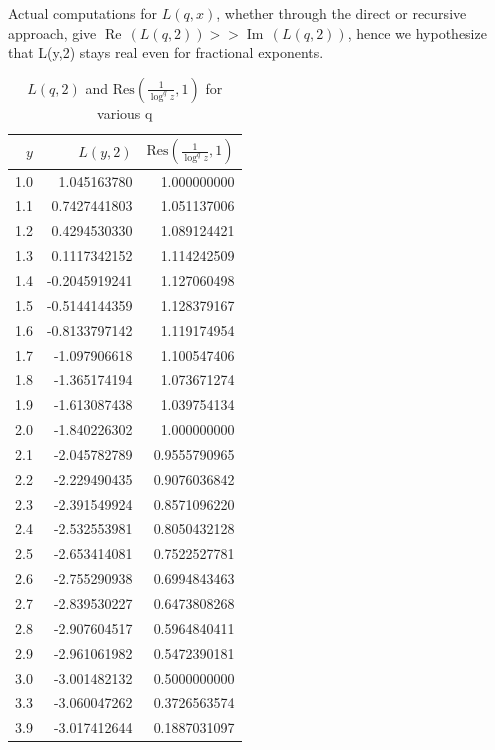 \documentclass[a4paper,11pt,twoside]{amsart}
\newcommand\Res{\mathrm{Res}}
\renewcommand\Re{{\operatorname{Re\,}}}
\renewcommand\Im{{\operatorname{Im\,}}}
\begin{document}
Actual computations for $L(q,x)$, whether through the direct or recursive approach, give $\Re(L(q,2)) >> \Im(L(q,2))$,
hence we hypothesize that L(y,2) stays real even for fractional exponents.
 
\begin{table}[H]
  \begin{center}
    \begin{tabular}{r|r|r} %
      $y$ & $L(y,2)$ & $\Res(\frac{1}{\log^{q} z},1)$	\\
      \hline
      1.0 &  1.045163780 &  1.000000000\\
      1.1 &  0.7427441803 &  1.051137006\\
      1.2 &  0.4294530330 &  1.089124421\\
      1.3 &  0.1117342152 &  1.114242509\\
      1.4 &  -0.2045919241 &  1.127060498\\
      1.5 &  -0.5144144359 &  1.128379167\\
      1.6 &  -0.8133797142 &  1.119174954\\
      1.7 &  -1.097906618 &  1.100547406\\
      1.8 &  -1.365174194 &  1.073671274\\
      1.9 &  -1.613087438 &  1.039754134\\
      2.0 &  -1.840226302 &  1.000000000\\
      2.1 &  -2.045782789 &  0.9555790965\\
      2.2 &  -2.229490435 &  0.9076036842\\
      2.3 &  -2.391549924 &  0.8571096220\\
      2.4 &  -2.532553981 &  0.8050432128\\
      2.5 &  -2.653414081 &  0.7522527781\\
      2.6 &  -2.755290938 &  0.6994843463\\
      2.7 &  -2.839530227 &  0.6473808268\\
      2.8 &  -2.907604517 &  0.5964840411\\
      2.9 &  -2.961061982 & 0.5472390181\\
      3.0 &  -3.001482132 & 0.5000000000\\
      3.3 &  -3.060047262 & 0.3726563574\\
      3.9 &  -3.017412644 & 0.1887031097\\
    \end{tabular}
    \caption{$L(q,2)$ and $\Res(\frac{1}{\log^{q} z},1)$ for various q}
  \end{center}
\end{table}
\vspace{-2em}
\end{document}
